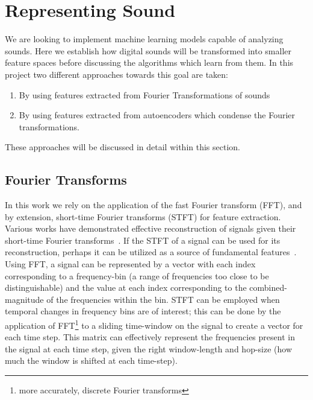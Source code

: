 \documentclass[\main/thesis.tex]{subfiles}
\begin{document}
\section{Representing Sound}
\label{chap:represent_sound}
We are looking to implement machine learning models capable of analyzing sounds. Here we establish how digital sounds will be transformed into smaller feature spaces before discussing the algorithms which learn from them. In this project two different approaches towards this goal are taken: 
\begin{enumerate}
    \item By using features extracted from Fourier Transformations of sounds \item By using features extracted from autoencoders which condense the Fourier transformations. 
\end{enumerate}
These approaches will be discussed in detail within this section.
\subsection{Fourier Transforms}
\label{sec:fourier_transforms}
In this work we rely on the application of the fast Fourier transform (FFT), and by extension, short-time Fourier transforms (STFT) for feature extraction. Various works have demonstrated effective reconstruction of signals given their short-time Fourier transforms~\cite{nawab1983signal,griffin1984signal}. If the STFT of a signal can be used for its reconstruction, perhaps it can be utilized as a source of fundamental features~\cite{lee2009unsupervised,huzaifah2017comparison}. Using FFT, a signal can be represented by a vector with each index corresponding to a frequency-bin (a range of frequencies too close to be distinguishable) and the value at each index corresponding to the combined-magnitude of the frequencies within the bin. STFT can be employed when temporal changes in frequency bins are of interest; this can be done by the application of FFT\footnote{more accurately, discrete Fourier transforms} to a sliding time-window on the signal to create a vector for each time step. This matrix can effectively represent the frequencies present in the signal at each time step, given the right window-length and hop-size (how much the window is shifted at each time-step). 
\end{document}
